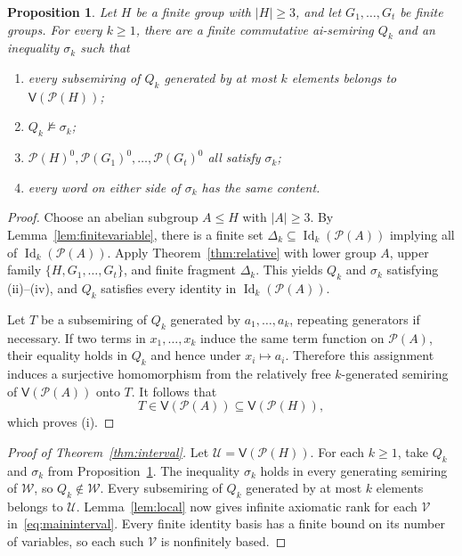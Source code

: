 \documentclass[10pt,a4paper]{amsart}
\newtheorem{proposition}[theorem]{Proposition}
\numberwithin{equation}{section}
\newcommand{\Pow}{\mathcal{P}}
\newcommand{\Full}[1]{\mathcal{P}(#1)^0}
\newcommand{\Var}{\mathsf{V}}
\newcommand{\Id}{\operatorname{Id}}
\newcommand{\calU}{\mathcal{U}}
\newcommand{\calV}{\mathcal{V}}
\newcommand{\calW}{\mathcal{W}}
\renewcommand{\leq}{\leqslant}
\renewcommand{\geq}{\geqslant}
\begin{document}
\begin{proposition}\label{prop:localwitness}
Let $H$ be a finite group with $|H|\geq 3$, and let $G_1,\ldots,G_t$ be finite groups. For every $k\geq 1$, there are a finite commutative ai-semiring $Q_k$ and an inequality $\sigma_k$ such that
\begin{enumerate}[label=\textup{(\roman*)},leftmargin=2.4em]
\item every subsemiring of $Q_k$ generated by at most $k$ elements belongs to $\Var(\Pow(H))$;
\item $Q_k\not\models\sigma_k$;
\item $\Full{H},\Full{G_1},\ldots,\Full{G_t}$ all satisfy $\sigma_k$;
\item every word on either side of $\sigma_k$ has the same content.
\end{enumerate}
\end{proposition}
\begin{proof}
Choose an abelian subgroup $A\leq H$ with $|A|\geq 3$. By Lemma~\ref{lem:finitevariable}, there is a finite set $\Delta_k\subseteq\Id_k(\Pow(A))$ implying all of $\Id_k(\Pow(A))$. Apply Theorem~\ref{thm:relative} with lower group $A$, upper family $\{H,G_1,\ldots,G_t\}$, and finite fragment $\Delta_k$. This yields $Q_k$ and $\sigma_k$ satisfying (ii)--(iv), and $Q_k$ satisfies every identity in $\Id_k(\Pow(A))$.

Let $T$ be a subsemiring of $Q_k$ generated by $a_1,\ldots,a_k$, repeating generators if necessary. If two terms in $x_1,\ldots,x_k$ induce the same term function on $\Pow(A)$, their equality holds in $Q_k$ and hence under $x_i\mapsto a_i$. Therefore this assignment induces a surjective homomorphism from the relatively free $k$-generated semiring of $\Var(\Pow(A))$ onto $T$. It follows that
\[
 T\in\Var(\Pow(A))\subseteq\Var(\Pow(H)),
\]
which proves (i).
\end{proof}


\begin{proof}[Proof of Theorem~\ref{thm:interval}]
Let $\calU=\Var(\Pow(H))$. For each $k\geq 1$, take $Q_k$ and $\sigma_k$ from Proposition~\ref{prop:localwitness}. The inequality $\sigma_k$ holds in every generating semiring of $\calW$, so $Q_k\notin\calW$. Every subsemiring of $Q_k$ generated by at most $k$ elements belongs to $\calU$. Lemma~\ref{lem:local} now gives infinite axiomatic rank for each $\calV$ in~\eqref{eq:maininterval}. Every finite identity basis has a finite bound on its number of variables, so each such $\calV$ is nonfinitely based.
\end{proof}
\end{document}

